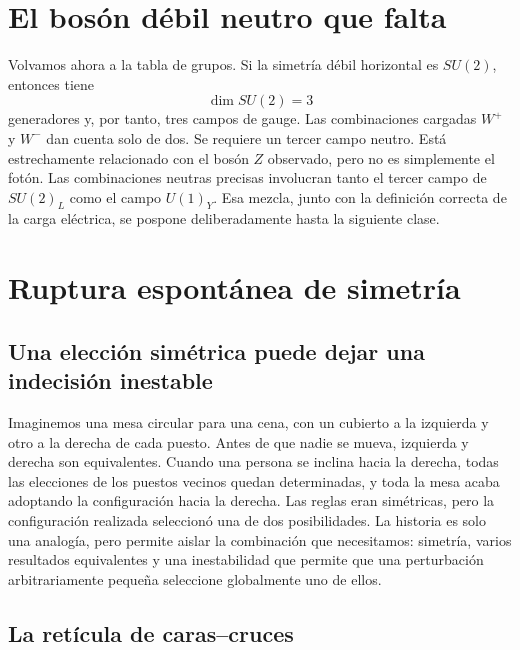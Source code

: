 \section{El bosón débil neutro que falta}

Volvamos ahora a la tabla de grupos. Si la simetría débil horizontal es \(SU(2)\),
entonces tiene
\begin{equation}
  \dim SU(2)=3
\end{equation}
generadores y, por tanto, tres campos de gauge. Las combinaciones cargadas
\(W^+\) y \(W^-\) dan cuenta solo de dos. Se requiere un tercer campo neutro.
Está estrechamente relacionado con el bosón \(Z\) observado, pero no es simplemente el
fotón. Las combinaciones neutras precisas involucran tanto el tercer campo de
\(SU(2)_L\) como el campo \(U(1)_Y\). Esa mezcla, junto con la definición correcta
de la carga eléctrica, se pospone deliberadamente hasta la siguiente clase.

\section{Ruptura espontánea de simetría}

\subsection{Una elección simétrica puede dejar una indecisión inestable}

Imaginemos una mesa circular para una cena, con un cubierto a la izquierda y otro a
la derecha de cada puesto. Antes de que nadie se mueva, izquierda y derecha son
equivalentes. Cuando una persona se inclina hacia la derecha, todas las elecciones
de los puestos vecinos quedan determinadas, y toda la mesa acaba adoptando la
configuración hacia la derecha. Las reglas eran simétricas, pero la configuración
realizada seleccionó una de dos posibilidades. La historia es solo una analogía, pero
permite aislar la combinación que necesitamos: simetría, varios resultados equivalentes
y una inestabilidad que permite que una perturbación arbitrariamente pequeña
seleccione globalmente uno de ellos.

\subsection{La retícula de caras--cruces}

